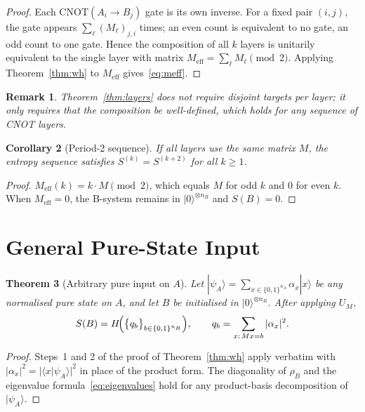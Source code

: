 \documentclass[11pt,a4paper]{article}
\newtheorem{theorem}{Theorem}[section]
\newtheorem{corollary}[theorem]{Corollary}
\newtheorem{remark}[theorem]{Remark}
\newcommand{\VNE}{S}
\begin{document}
\begin{proof}
Each $\mathrm{CNOT}(A_i \to B_j)$ gate is its own inverse.
For a fixed pair $(i,j)$, the gate appears $\sum_\ell (M_\ell)_{j,i}$ times;
an even count is equivalent to no gate, an odd count to one gate.
Hence the composition of all $k$ layers is unitarily equivalent to the
single layer with matrix $M_{\mathrm{eff}} = \sum_\ell M_\ell \pmod{2}$.
Applying Theorem~\ref{thm:wh} to $M_{\mathrm{eff}}$ gives~\eqref{eq:meff}.
\end{proof}

\begin{remark}
Theorem~\ref{thm:layers} does not require disjoint targets per layer;
it only requires that the \emph{composition} be well-defined, which holds
for any sequence of CNOT layers.
\end{remark}

\begin{corollary}[Period-2 sequence]
\label{cor:period2}
If all layers use the same matrix $M$, the entropy sequence satisfies
$\VNE^{(k)} = \VNE^{(k+2)}$ for all $k \geq 1$.
\end{corollary}

\begin{proof}
$M_{\mathrm{eff}}(k) = k \cdot M \pmod{2}$, which equals $M$ for odd $k$
and $0$ for even $k$.  When $M_{\mathrm{eff}} = 0$, the B-system remains in
$|0\rangle^{\otimes n_B}$ and $\VNE(B) = 0$.
\end{proof}

\section{General Pure-State Input}
\label{sec:pure}

\begin{theorem}[Arbitrary pure input on $A$]
\label{thm:pure}
Let $|\psi_A\rangle = \sum_{x \in \{0,1\}^{n_A}} \alpha_x |x\rangle$ be any
normalised pure state on $A$, and let $B$ be initialised in
$|0\rangle^{\otimes n_B}$.  After applying $U_M$,
\begin{equation}
  \VNE(B) = H\!\Bigl(\bigl\{q_b\bigr\}_{b \in \{0,1\}^{n_B}}\Bigr),
  \qquad
  q_b = \sum_{x:\, Mx = b} |\alpha_x|^2.
  \label{eq:pure}
\end{equation}
\end{theorem}

\begin{proof}
Steps~1 and 2 of the proof of Theorem~\ref{thm:wh} apply verbatim with
$|\alpha_x|^2 = |\langle x|\psi_A\rangle|^2$ in place of the product form.
The diagonality of $\rho_B$ and the eigenvalue formula~\eqref{eq:eigenvalues}
hold for any product-basis decomposition of $|\psi_A\rangle$.
\end{proof}
\end{document}
